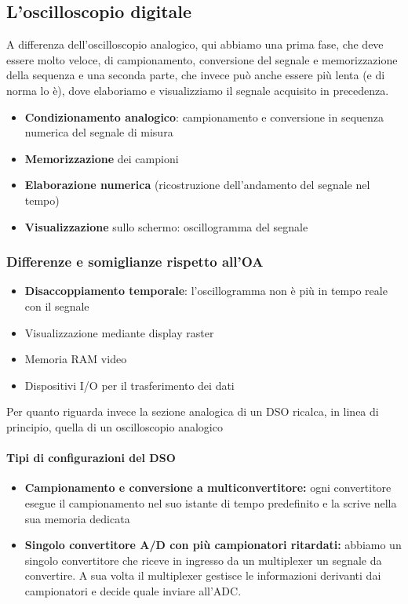 \documentclass{article}
\begin{document}
	\subsection*{L'oscilloscopio digitale}
	A differenza dell'oscilloscopio analogico, qui abbiamo una prima fase, che deve essere molto veloce, di campionamento, conversione del segnale e memorizzazione della sequenza e una seconda parte, che invece può anche essere più lenta (e di norma lo è), dove elaboriamo e visualizziamo il segnale acquisito in precedenza.
	\begin{itemize}
		\item\textbf{Condizionamento analogico}: campionamento e conversione in sequenza numerica del segnale di misura
		\item \textbf{Memorizzazione} dei campioni
		\item \textbf{Elaborazione numerica} (ricostruzione dell'andamento del segnale nel tempo)
		\item \textbf{Visualizzazione} sullo schermo: oscillogramma del segnale
	\end{itemize}
	\subsubsection*{Differenze e somiglianze rispetto all'OA}
	\begin{itemize}
		\item \textbf{Disaccoppiamento temporale}: l'oscillogramma non è più in tempo reale con il segnale
		\item Visualizzazione mediante display raster
		\item Memoria RAM video
		\item Dispositivi I/O per il trasferimento dei dati
	\end{itemize}
	Per quanto riguarda invece la sezione analogica di un DSO ricalca, in linea di principio, quella di un oscilloscopio analogico
	\paragraph*{Tipi di configurazioni del DSO}
	\begin{itemize}
		\item \textbf{Campionamento e conversione a multiconvertitore:} ogni convertitore esegue il campionamento nel suo istante di tempo predefinito e la scrive nella sua memoria dedicata
		\item \textbf{Singolo convertitore A/D con più campionatori ritardati:} abbiamo un singolo convertitore che riceve in ingresso da un multiplexer un segnale da convertire. A sua volta il multiplexer gestisce le informazioni derivanti dai campionatori e decide quale inviare all'ADC.
	\end{itemize}
\end{document}
